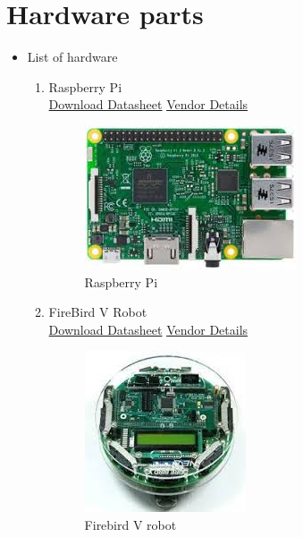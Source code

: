 \documentclass[a4paper,12pt,oneside]{book}
\begin{document}
\section{Hardware parts}
\begin{itemize}
  \item List of hardware 
  \begin{enumerate}
      \item Raspberry Pi \\
      \href{www.cdn-shop.adafruit.com/pdfs/raspberrypi2modelb.pdf} {Download Datasheet}
      \href{http://www.amazon.in/Raspberry-Pi-Model-1GB-Complete/dp/B00T2U7R7I} {Vendor Details}
      \begin{figure}[H]
        \centering
        \includegraphics[scale=0.6]{RPi}
        \caption{Raspberry Pi}
      \end{figure}
      
      \item FireBird V Robot \\
      \href{www.atmel.com/Images/Atmel-2549-8-bit-AVR-Microcontroller-ATmega640-1280-1281-2560-2561_datasheet.pdf} {Download Datasheet}
      \href{http://www.nex-robotics.com/products/fire-bird-v-robots/fire-bird-v-atmega2560-robotic-research-platform.html} {Vendor Details}
      \begin{figure}[H]
        \centering
        \includegraphics[scale=0.6]{Firebird_V_robot}
        \caption{Firebird V robot}
      \end{figure}
      

\end{enumerate}
\end{itemize}
\end{document}
